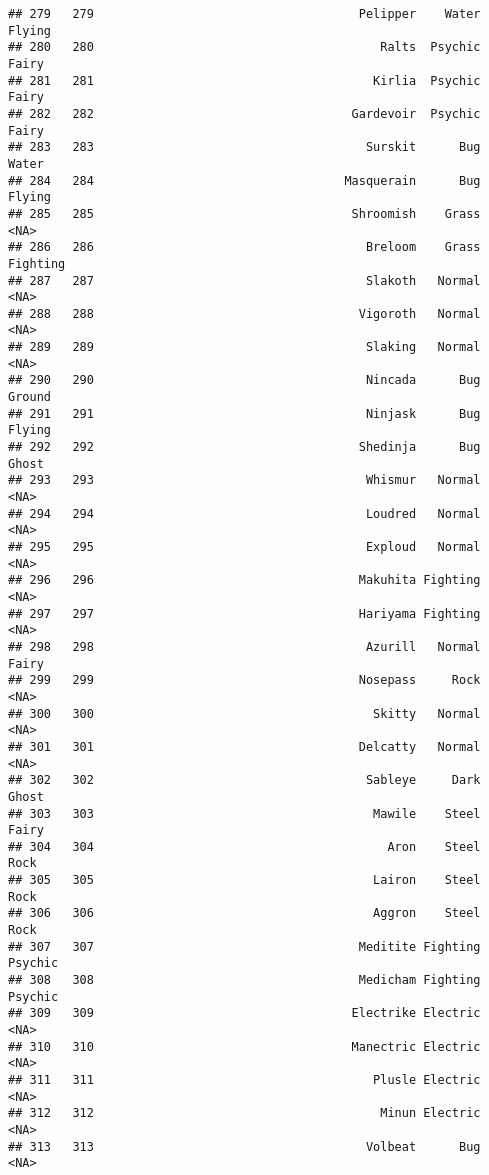 \documentclass[
]{article}
\begin{document}
\begin{verbatim}
## 279   279                                     Pelipper    Water   Flying
## 280   280                                        Ralts  Psychic    Fairy
## 281   281                                       Kirlia  Psychic    Fairy
## 282   282                                    Gardevoir  Psychic    Fairy
## 283   283                                      Surskit      Bug    Water
## 284   284                                   Masquerain      Bug   Flying
## 285   285                                    Shroomish    Grass     <NA>
## 286   286                                      Breloom    Grass Fighting
## 287   287                                      Slakoth   Normal     <NA>
## 288   288                                     Vigoroth   Normal     <NA>
## 289   289                                      Slaking   Normal     <NA>
## 290   290                                      Nincada      Bug   Ground
## 291   291                                      Ninjask      Bug   Flying
## 292   292                                     Shedinja      Bug    Ghost
## 293   293                                      Whismur   Normal     <NA>
## 294   294                                      Loudred   Normal     <NA>
## 295   295                                      Exploud   Normal     <NA>
## 296   296                                     Makuhita Fighting     <NA>
## 297   297                                     Hariyama Fighting     <NA>
## 298   298                                      Azurill   Normal    Fairy
## 299   299                                     Nosepass     Rock     <NA>
## 300   300                                       Skitty   Normal     <NA>
## 301   301                                     Delcatty   Normal     <NA>
## 302   302                                      Sableye     Dark    Ghost
## 303   303                                       Mawile    Steel    Fairy
## 304   304                                         Aron    Steel     Rock
## 305   305                                       Lairon    Steel     Rock
## 306   306                                       Aggron    Steel     Rock
## 307   307                                     Meditite Fighting  Psychic
## 308   308                                     Medicham Fighting  Psychic
## 309   309                                    Electrike Electric     <NA>
## 310   310                                    Manectric Electric     <NA>
## 311   311                                       Plusle Electric     <NA>
## 312   312                                        Minun Electric     <NA>
## 313   313                                      Volbeat      Bug     <NA>

\end{verbatim}
\end{document}
